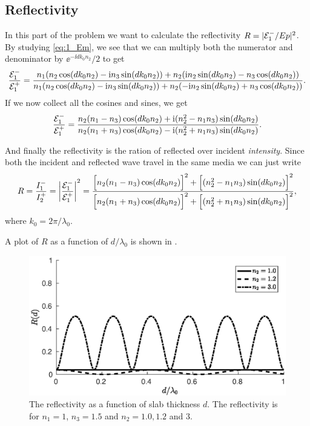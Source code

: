 \documentclass[11pt,letter, swedish, english
]{article}
\begin{document}
\subsection{Reflectivity}
In this part of the problem we want to calculate the reflectivity
$R=|{\mathcal{E}_1^-}/Ep|^2$. By studying \eqref{eq:1_Em}, we see that we can
multiply both the numerator and denominator by $\ee^{-\ii dk_0n_2}/2$ to
get
\begin{equation}
\frac{{\mathcal{E}_1^-}}{{\mathcal{E}_1^+}}=
\frac{
n_1 (n_2\cos(dk_0n_2) -\mathrm{i} n_3\sin(dk_0n_2)) + 
 n_2 (\mathrm{i} n_2\sin(dk_0n_2) - n_3\cos(dk_0n_2))
}{
n_1 (n_2\cos(dk_0n_2) - \mathrm{i} n_3\sin(dk_0n_2)) + 
 n_2 (-\mathrm{i} n_2\sin(dk_0n_2) + n_3\cos(dk_0n_2))
}.
\end{equation}
If we now collect all the cosines and sines, we get
\begin{equation}
\frac{{\mathcal{E}_1^-}}{{\mathcal{E}_1^+}}=\frac{
n_2(n_1-n_3)\cos(dk_0n_2) +\mathrm{i}(n_2^2 -n_1n_3)\sin(dk_0n_2)
}{
n_2(n_1 +n_3)\cos(dk_0n_2) - \mathrm{i}(n_2^2 +n_1n_3)\sin(dk_0n_2) 
}.
\end{equation}

And finally the reflectivity is the ration of reflected over incident
\emph{intensity}. Since both the incident and reflected wave travel in
the same media we can just write
\begin{equation}
R =\frac{I_1^-}{I_2^+}= \abs{\frac{{\mathcal{E}_1^-}}{{\mathcal{E}_1^+}}}^2=
\frac{
\Big[n_2(n_1-n_3)\cos(dk_0n_2)\Big]^2 
+\Big[(n_2^2 -n_1n_3)\sin(dk_0n_2)\Big]^2
}{
\Big[n_2(n_1 +n_3)\cos(dk_0n_2)\Big]^2 
+\Big[(n_2^2 +n_1n_3)\sin(dk_0n_2)\Big]^2 
},
\end{equation}
where $k_0=2\pi/\lambda_0$.

A plot of $R$ as a function of $d/\lambda_0$ is shown in
. 


\begin{figure}
\centering
\includegraphics[width=.9\textwidth]{1a_R.eps}
\caption{The reflectivity as a function of slab thickness $d$. The
  reflectivity is for $n_1=1$, $n_3=1.5$ and $n_2=1.0, 1.2$ and 3.}
\label{fig:1a_R}
\end{figure}
\end{document}
